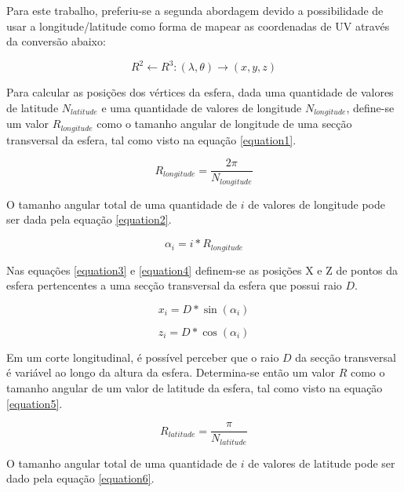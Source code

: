 \documentclass{vgtc}                          %
\begin{document}
Para este trabalho, preferiu-se a segunda abordagem devido a possibilidade de usar a longitude/latitude como forma de mapear as coordenadas de UV através da conversão abaixo:

\begin{equation}
R^2 \leftarrow R^3 : (\lambda, \theta) \rightarrow (x, y, z)
\label{equation1}
\end{equation}

Para calcular as posições dos vértices da esfera, dada uma quantidade de valores de latitude $N_{latitude}$ e uma quantidade de valores de longitude $N_{longitude}$, define-se um valor $R_{longitude}$ como o tamanho angular de longitude de uma secção transversal da esfera, tal como visto na equação \ref{equation1}.

\begin{equation}
R_{longitude} = \frac{2 \pi}{N_{longitude}}
\label{equation1}
\end{equation}

O tamanho angular total de uma quantidade de $i$ de valores de longitude pode ser dada pela equação \ref{equation2}.

\begin{equation}
\alpha_{i} = i * R_{longitude}
\label{equation2}
\end{equation}

Nas equações \ref{equation3} e \ref{equation4} definem-se as posições X e Z de pontos da esfera pertencentes a uma secção transversal da esfera que possui raio $D$.

\begin{equation}
x_{i} = D * \sin(\alpha_{i})
\label{equation3}
\end{equation}

\begin{equation}
z_{i} = D * \cos(\alpha_{i})
\label{equation4}
\end{equation}

Em um corte longitudinal, é possível perceber que o raio $D$ da secção transversal é variável ao longo da altura da esfera. Determina-se então um valor $R$ como o tamanho angular de um valor de latitude da esfera, tal como visto na equação \ref{equation5}.

\begin{equation}
R_{latitude} = \frac{\pi}{ N_{latitude}}
\label{equation5}
\end{equation}

O tamanho angular total de uma quantidade de $i$ de valores de latitude pode ser dado pela equação \ref{equation6}.
\end{document}
